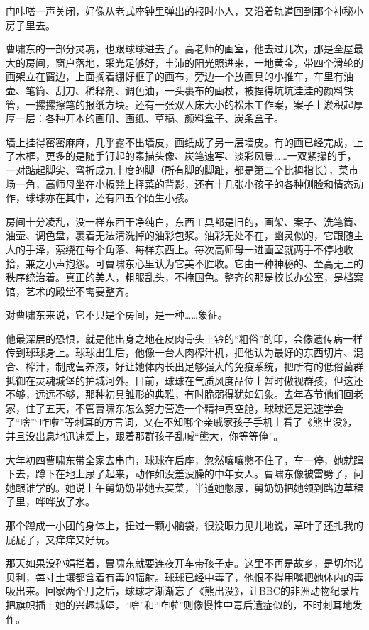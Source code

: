 \documentclass[lang=cn,newtx,12pt,scheme=chinese]{elegantbook}
\begin{document}
门咔嗒一声关闭，好像从老式座钟里弹出的报时小人，又沿着轨道回到那个神秘小房子里去。

曹啸东的一部分灵魂，也跟球球进去了。高老师的画室，他去过几次，那是全屋最大的房间，窗户落地，采光足够好，丰沛的阳光照进来，一地黄金，带四个滑轮的画架立在窗边，上面搁着绷好框子的画布，旁边一个放画具的小推车，车里有油壶、笔筒、刮刀、稀释剂、调色油，一头裹布的画杖，被捏得坑坑洼洼的颜料铁管，一摞摞擦笔的报纸方块。还有一张双人床大小的松木工作案，案子上淤积起厚厚一层：各种开本的画册、画纸、草稿、颜料盒子、炭条盒子。

墙上挂得密密麻麻，几乎露不出墙皮，画纸成了另一层墙皮。有的画已经完成，上了木框，更多的是随手钉起的素描头像、炭笔速写、淡彩风景……一双紧攥的手，一对踮起脚尖、弯折成九十度的脚（所有脚的脚趾，都是第二个比拇指长），菜市场一角，高师母坐在小板凳上择菜的背影，还有十几张小孩子的各种侧脸和情态动作，球球亦在其中，还有四五个陌生小孩。

房间十分凌乱，没一样东西干净纯白，东西工具都是旧的，画架、案子、洗笔筒、油壶、调色盘，裹着无法清洗掉的油彩包浆。油彩无处不在，幽灵似的，它跟随主人的手泽，萦绕在每个角落、每样东西上。每次高师母一进画室就两手不停地收拾，兼之小声抱怨。可曹啸东心里认为它美不胜收。它由一种神秘的、至高无上的秩序统治着。真正的美人，粗服乱头，不掩国色。整齐的那是校长办公室，是档案馆，艺术的殿堂不需要整齐。

对曹啸东来说，它不只是个房间，是一种……象征。

他最深层的恐惧，就是他出身之地在皮肉骨头上钤的“粗俗”的印，会像遗传病一样传到球球身上。球球出生后，他像一台人肉榨汁机，把他认为最好的东西切片、混合、榨汁，制成营养液，好让她体内长出足够强大的免疫系统，把所有的低俗菌群抵御在灵魂城堡的护城河外。目前，球球在气质风度品位上暂时傲视群孩，但这还不够，远远不够，那种初具雏形的典雅，有时脆弱得犹如幻象。去年春节他们回老家，住了五天，不管曹啸东怎么努力营造一个精神真空舱，球球还是迅速学会了“啥”“咋啦”等刺耳的方言词，又在不知哪个亲戚家孩子手机上看了《熊出没》，并且没出息地迅速爱上，跟着那群孩子乱喊“熊大，你等等俺”。

大年初四曹啸东带全家去串门，球球在后座，忽然嚷嚷憋不住了，车一停，她就蹿下去，蹲下在地上尿了起来，动作如没羞没臊的中年女人。曹啸东像被雷劈了，问她跟谁学的。她说上午舅奶奶带她去买菜，半道她憋尿，舅奶奶把她领到路边草稞子里，哗哗放了水。

那个蹲成一小团的身体上，扭过一颗小脑袋，很没眼力见儿地说，草叶子还扎我的屁屁了，又痒痒又好玩。

那天如果没孙娟拦着，曹啸东就要连夜开车带孩子走。这里不再是故乡，是切尔诺贝利，每寸土壤都含着有毒的辐射。球球已经中毒了，他恨不得用嘴把她体内的毒吸出来。回家两个月之后，球球才渐渐忘了《熊出没》，让BBC的非洲动物纪录片把旗帜插上她的兴趣城堡，“啥”和“咋啦”则像慢性中毒后遗症似的，不时刺耳地发作。
\end{document}
